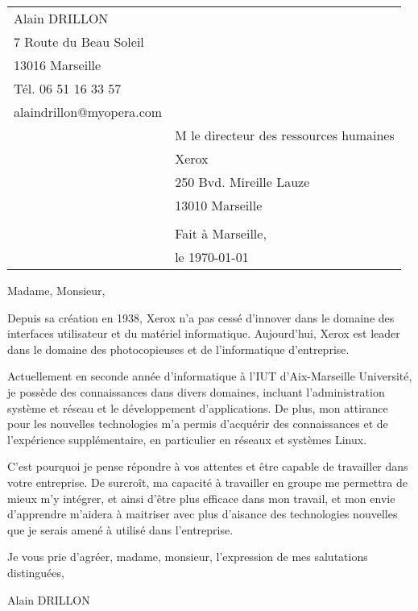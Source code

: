 \documentclass[11pt]{article}
\begin{document}
    \thispagestyle{empty}
    \begin{tabular}{p{10cm}p{10cm}}
        Alain DRILLON \\ 
        7 Route du Beau Soleil \\
        13016 Marseille \\
        Tél. 06 51 16 33 57\\
        alaindrillon@myopera.com\\
        & M le directeur des ressources humaines\\
        & Xerox\\
        & 250 Bvd. Mireille Lauze\\
        & 13010 Marseille \\
        & \\
        & Fait à Marseille,\\
        & le \today\\
    \end{tabular}

    \vspace{2cm}

    Madame, Monsieur,
    \vspace{0.75cm}

    Depuis sa création en 1938, Xerox n'a pas cessé d'innover dans le domaine des interfaces utilisateur et du matériel informatique. Aujourd'hui, Xerox est leader dans le domaine des photocopieuses et de l'informatique d'entreprise.

    \vspace{0.75cm}
    Actuellement en seconde année d'informatique à l'IUT d'Aix-Marseille Université, je possède des connaissances dans divers domaines, incluant l'administration système et réseau et le développement d'applications.
    De plus, mon attirance pour les nouvelles technologies m'a permis d’acquérir des connaissances et de l'expérience supplémentaire, en particulier en réseaux et systèmes Linux.
   
   C'est pourquoi je pense répondre à vos attentes et être capable de travailler dans votre entreprise. De surcroît, ma capacité à travailler en groupe me permettra de mieux m'y intégrer, et ainsi d'être plus efficace dans mon travail, et mon envie d'apprendre m'aidera à maitriser avec plus d'aisance des technologies nouvelles que je serais amené à utilisé dans l'entreprise.

   \vspace{0.50cm}
   Je vous prie d'agréer, madame, monsieur, l'expression de mes salutations distinguées,

   \vspace{0.50cm}
   Alain DRILLON
\end{document}
